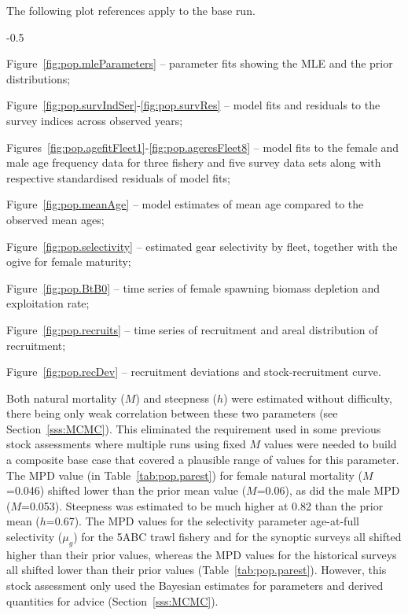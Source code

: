 \documentclass[11pt]{book}
\begin{document}
The following plot references apply to the base run.
\begin{itemize_csas}{-0.5}{}
  \item Figure~\ref{fig:pop.mleParameters} -- parameter fits showing the MLE and the prior distributions;
  \item Figure~\ref{fig:pop.survIndSer}-\ref{fig:pop.survRes} -- model fits and residuals to the survey indices across observed years;
  \item Figures~\ref{fig:pop.agefitFleet1}-\ref{fig:pop.ageresFleet8} -- model fits to the female and male age frequency data for three fishery and five survey data sets along with respective standardised residuals of model fits;
  \item Figure~\ref{fig:pop.meanAge} -- model estimates of mean age compared to the observed mean ages;
  \item Figure~\ref{fig:pop.selectivity} -- estimated gear selectivity  by fleet, together with the ogive for female maturity;
  \item Figure~\ref{fig:pop.BtB0} -- time series of female spawning biomass depletion and exploitation rate;
  \item Figure~\ref{fig:pop.recruits} -- time series of recruitment and areal distribution of recruitment;
  \item Figure~\ref{fig:pop.recDev} -- recruitment deviations and stock-recruitment curve.
\end{itemize_csas}


Both natural mortality ($M$) and steepness ($h$) were estimated without difficulty, there being only weak correlation between these two parameters (see Section~\ref{sss:MCMC}). 
This eliminated the requirement used in some previous stock assessments where multiple runs using fixed $M$ values were needed to build a composite base case that covered a plausible range of values for this parameter. 
The MPD value (in Table~\ref{tab:pop.parest}) for female natural mortality ($M$=0.046) shifted lower than the prior mean value ($M$=0.06), as did the male MPD ($M$=0.053). 
Steepness was estimated to be much higher at 0.82 than the prior mean ($h$=0.67).
The MPD values for the selectivity parameter age-at-full selectivity ($\mu_g$) for the 5ABC trawl fishery and for the synoptic surveys all shifted higher than their prior values, whereas the MPD values for the historical surveys all shifted lower than their prior values (Table~\ref{tab:pop.parest}).
However, this stock assessment only used the Bayesian estimates for parameters and derived quantities for advice (Section~\ref{sss:MCMC}).
\end{document}

